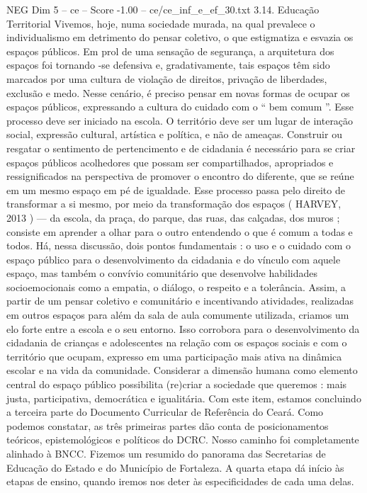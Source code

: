 \begin{textsample}{NEG Dim 5 – ce – Score -1.00 – ce/ce\_inf\_e\_ef\_30.txt}  \label{ex:f5_neg_039}
3.14.
Educação Territorial Vivemos, hoje, numa sociedade murada, na qual prevalece o individualismo em detrimento do pensar coletivo, o que estigmatiza e esvazia os espaços públicos.
Em prol de uma sensação de segurança, a arquitetura dos espaços foi tornando -se defensiva e, gradativamente, tais espaços têm sido marcados por uma cultura de violação de direitos, privação de liberdades, exclusão e medo.
Nesse cenário, é preciso pensar em novas formas de ocupar os espaços públicos, expressando a cultura do cuidado com o “ bem comum ”.
Esse processo deve ser iniciado na escola.
O território deve ser um lugar de interação social, expressão cultural, artística e política, e não de ameaças.
Construir ou resgatar o sentimento de pertencimento e de cidadania é necessário para se criar espaços públicos acolhedores que possam ser compartilhados, apropriados e ressignificados na perspectiva de promover o encontro do diferente, que se reúne em um mesmo espaço em pé de igualdade.
Esse processo passa pelo direito de transformar a si mesmo, por meio da transformação dos espaços ( HARVEY, 2013 ) — da escola, da praça, do parque, das ruas, das calçadas, dos muros ; consiste em aprender a olhar para o outro entendendo o que é comum a todas e todos.
Há, nessa discussão, dois pontos fundamentais : o uso e o cuidado com o espaço público para o desenvolvimento da cidadania e do vínculo com aquele espaço, mas também o convívio comunitário que desenvolve habilidades socioemocionais como a empatia, o diálogo, o respeito e a tolerância.
Assim, a partir de um pensar coletivo e comunitário e incentivando atividades, realizadas em outros espaços para além da sala de aula comumente utilizada, criamos um elo forte entre a escola e o seu entorno.
Isso corrobora para o desenvolvimento da cidadania de crianças e adolescentes na relação com os espaços sociais e com o território que ocupam, expresso em uma participação mais ativa na dinâmica escolar e na vida da comunidade.
Considerar a dimensão humana como elemento central do espaço público possibilita (re)criar a sociedade que queremos : mais justa, participativa, democrática e igualitária.
Com este item, estamos concluindo a terceira parte do Documento Curricular de Referência do Ceará.
Como podemos constatar, as três primeiras partes dão conta de posicionamentos teóricos, epistemológicos e políticos do DCRC.
Nosso caminho foi completamente alinhado à BNCC.
Fizemos um resumido do panorama das Secretarias de Educação do Estado e do Município de Fortaleza.
A quarta etapa dá início às etapas de ensino, quando iremos nos deter às especificidades de cada uma delas.

\end{textsample}
